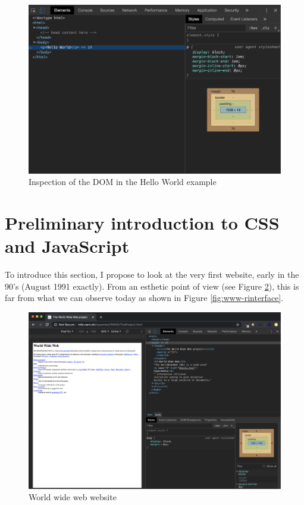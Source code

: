 \documentclass[]{book}
\begin{document}
\begin{figure}
\includegraphics[width=21.5in]{images/survival-kit/dom} \caption{Inspection of the DOM in the Hello World example}\label{fig:html-dom}
\end{figure}

\hypertarget{preliminary-introduction-to-css-and-javascript}{%
\section{Preliminary introduction to CSS and JavaScript}\label{preliminary-introduction-to-css-and-javascript}}

To introduce this section, I propose to look at the very first website, early in the 90's (August 1991 exactly). From an esthetic point of view (see Figure \ref{fig:www-first}), this is far from what we can observe today as shown in Figure \ref{fig:www-rinterface}.

\begin{figure}
\includegraphics[width=33in]{images/survival-kit/www-first} \caption{World wide web website}\label{fig:www-first}
\end{figure}
\end{document}
